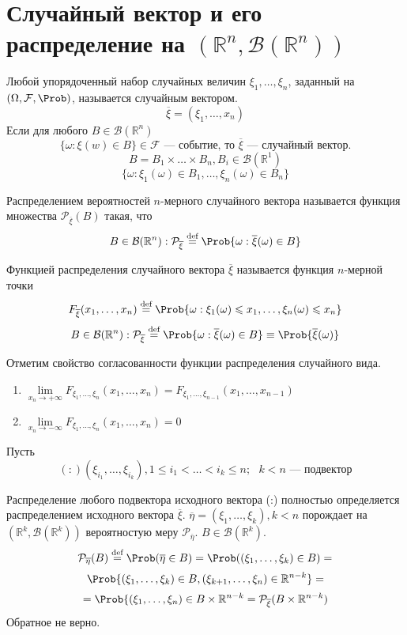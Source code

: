 \section{Случайный вектор и его распределение на $(\mathbb{R}^n, \mathcal{B}(\mathbb{R}^n))$}
\begin{definition}
	Любой упорядоченный набор случайных величин $\xi_1, \ldots, \xi_n$, заданный на $(\Omega, \mathcal{F}, \Prob)$, называется случайным вектором.
	\[
		\overline{\xi} = (\xi_1, \ldots, x_n)
	\]
	Если для любого $B \in \mathcal{B}(\mathbb{R}^n)$
	\[
		\{ \omega: \xi (w) \in B \} \in \mathcal{F} \text{ --- событие, то $\overline{\xi}$ --- случайный вектор.}
	\]
	\[
		B = B_1 \times \ldots \times B_n, B_i \in \mathcal{B} (\mathbb{R}^1)
	\]
	\[
		\{ \omega : \xi_1 (\omega) \in B_1, \ldots, \xi_n (\omega) \in B_n \}
	\]
\end{definition}
\begin{definition}
	Распределением вероятностей $n$-мерного случайного вектора называется функция множества $\mathcal{P}_{\overline{\xi}} (B)$ такая, что
	\[
		B \in \mathcal{B} (\mathbb{R}^n) : \mathcal{P}_{\overline{\xi}} \overset{\textrm{def}}{=} \Prob \{ \omega : \overline{\xi} (\omega) \in B \}
	\]
\end{definition}
\begin{definition}
	Функцией распределения случайного вектора $\overline{\xi}$ называется функция $n$-мерной точки
	\[
		F_{\overline{\xi}} (x_1, \ldots, x_n) \overset{\textrm{def}}{=} \Prob \{\omega : \xi_1 (\omega) \leqslant x_1, \ldots, \xi_n (\omega) \leqslant x_n \}
	\]
	\[
		B \in \mathcal{B} (\mathbb{R}^n) : \mathcal{P}_{\overline{\xi}} \overset{\textrm{def}}{=} \Prob \{ \omega : \overline{\xi} (\omega) \in B \} \equiv \Prob \{ \overline{\xi} (\omega) \}
	\]
\end{definition}
Отметим свойство согласованности функции распределения случайного вида.
\begin{enumerate}
	\item $\lim\limits_{x_n \to +\infty} F_{\xi_1, \ldots, \xi_n} (x_1, \ldots, x_n) = F_{\xi_1, \ldots, \xi_{n-1}} (x_1, \ldots, x_{n-1})$
	\item $\lim\limits_{x_n \to -\infty} F_{\xi_1, \ldots, \xi_n} (x_1, \ldots, x_n) = 0$
\end{enumerate}
Пусть
\[
 (:) (\xi_{i_1}, \ldots, \xi_{i_k}), 1 \leqslant i_1 < \ldots < i_k \leqslant n; \text{ $k < n$ --- подвектор}
\]
\begin{lemma}
	Распределение любого подвектора исходного вектора (:) полностью определяется распределением исходного вектора $\overline{\xi}$.
	$\overline{\eta} = (\xi_1, \ldots, \xi_k), k < n$ порождает на $(\mathbb{R}^k, \mathcal{B}(\mathbb{R}^k))$ вероятностую меру $\mathcal{P}_{\overline{\eta}}$. $B \in \mathcal{B}(\mathbb{R}^k)$.
\[
		\mathcal{P}_{\overline{\eta}}(B) \overset{\textrm{def}}{=} \Prob(\overline{\eta} \in B) = \Prob ((\xi_1, \ldots, \xi_k) \in B) =
\]
\[
	\Prob \{(\xi_1, \ldots, \xi_k) \in B, (\xi_{k+1}, \ldots, \xi_n) \in \mathbb{R}^{n-k} \} =
\]
\[
	 = \Prob \{(\xi_1, \ldots, \xi_n) \in B \times \mathbb{R}^{n-k} = \mathcal{P}_{\overline{\xi}} (B \times \mathbb{R}^{n-k})
\]
Обратное не верно.
\end{lemma}
